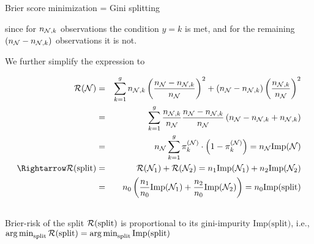 \documentclass[11pt,compress,t,notes=noshow, xcolor=table]{beamer}
\begin{document}
\begin{vbframe}{Brier score minimization = Gini splitting}
\begin{footnotesize}
since for $n_{\mathcal{N},k}$ observations the condition $y = k$ is met, and for the remaining $(n_{\mathcal{N}} - n_{\mathcal{N},k})$ observations it is not. 

\framebreak
We further simplify the expression to

\begin{eqnarray*}
\risk(\Np) &=&  \sum_{k = 1}^g n_{\Np,k}\left(\frac{n_{\Np } - n_{\Np,k}}{n_{\Np }}\right)^2 + (n_{\Np } - n_{\Np,k})\left(\frac{n_{\Np,k}}{n_{\Np }}\right)^2 \\
&=& \sum_{k = 1}^g \frac{n_{\Np,k}}{n_{\Np }} \frac{n_{\Np } - n_{\Np,k}}{n_{\Np }} \left(n_{\Np } - n_{\Np,k } + n_{\Np,k}\right) \\
&=& n_{\Np } \sum_{k = 1}^g \pikN \cdot \left(1 - \pikN \right) = n_\Np \text{Imp}(\Np)\\
 \Rightarrow \risk(\text{split}) &=& \risk(\Np_1) + \risk(\Np_2)  = n_1 \text{Imp}(\Np_1) + n_2 \text{Imp}(\Np_2)\\
 &=&n_0 \left(\frac{n_1}{n_0} \text{Imp}(\Np_1) + \frac{n_2}{n_0} \text{Imp}(\Np_2)\right) = n_0\text{Imp(split)}\\
\
\end{eqnarray*} 
Brier-risk of the split $\mathcal{R}(\text{split})$ is proportional to its gini-impurity $\text{Imp(split)}$, i.e., $\mathop{\mathrm{arg\,min}}_\text{split} \mathcal{R}(\text{split}) = \mathop{\mathrm{arg\,min}}_\text{split} \text{Imp(split)}$\\

\end{footnotesize}

\end{vbframe}


\endlecture
\end{document}
